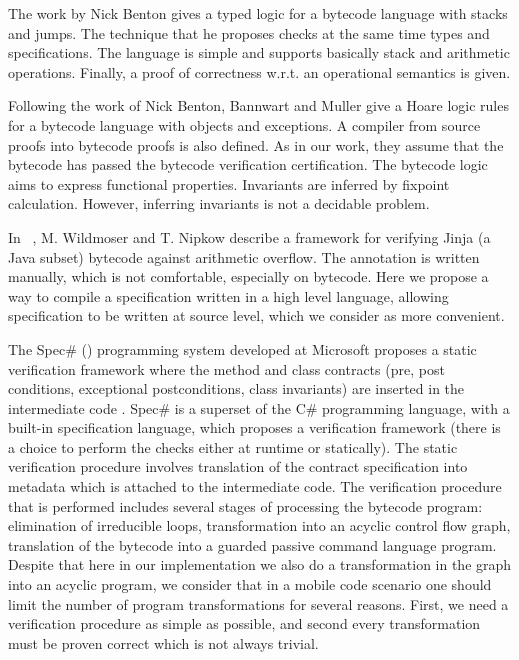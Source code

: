 The work by Nick Benton \cite{B04tlsj} gives a  typed logic for a bytecode language with stacks and jumps. 
The technique that he proposes checks at the same time types and specifications.
The language is simple and supports basically stack and arithmetic operations. Finally, a proof of correctness
w.r.t. an operational semantics is given.

Following the work of Nick Benton, Bannwart and Muller \cite{BM05plb} give  a Hoare logic rules
for a bytecode language with objects and  exceptions. A compiler from source proofs into bytecode proofs is also defined. 
As in our work, they assume that the bytecode has passed the bytecode verification certification. The bytecode logic aims to 
express functional properties. Invariants are inferred by fixpoint calculation.
However, inferring invariants is not a decidable problem.


In ~\cite{WildmoserN-ESOP05}, M. Wildmoser and T. Nipkow describe a framework for verifying Jinja (a Java subset) bytecode 
against arithmetic overflow.  The annotation is written manually, which is not comfortable, especially on bytecode. 
Here we propose a way to compile a specification written in a high level language, allowing specification to be written
 at source level, which we consider as more convenient. 

 The Spec\# (\cite{BLS04sp}) programming system developed at Microsoft proposes a static verification framework where 
 the method and class contracts  (pre, post conditions, exceptional postconditions, class invariants) are inserted in the intermediate code . 
 Spec\# is a superset of the C\# programming language, with a built-in  specification language, 
 which proposes a verification framework (there is a choice to perform the checks either at runtime or statically). 
 The static verification procedure  involves translation of the contract specification into metadata which is attached to the intermediate code. 
 The verification procedure \cite{leinoWPUP} that is performed includes several stages of processing the bytecode program:  
 elimination of irreducible loops, transformation into an acyclic control flow graph,
 translation of the bytecode into a guarded passive command language program. Despite that here in our implementation we also
 do a transformation in the graph into an acyclic program, we consider that in a mobile code scenario
 one should limit the number of program transformations for several reasons.
 First, we need a verification procedure as simple as possible, and second every transformation must be proven correct which is not always trivial.      


